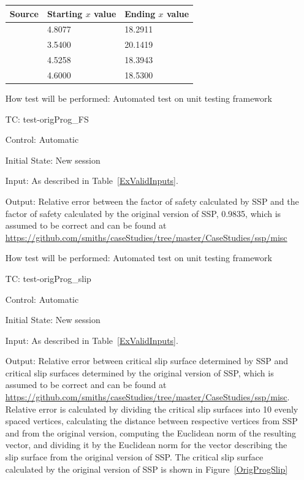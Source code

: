 \documentclass[12pt, titlepage]{article}
\newcounter{testnum} %
\newcommand{\progname}{SSP}
\begin{document}
\begin{enumerate}[label=TC\arabic*:,ref={\arabic*}]

\begin{tabularx}{1.0\textwidth}{l p{3.5cm} p{3.5cm}}
	\toprule \textbf{Source} & \textbf{Starting $x$ value} & 
	\textbf{Ending $x$ value}\\ \midrule
	\cite{Greco1996} & 4.8077 & 18.2911\\
	\cite{MalkawiEtAl} & 3.5400 & 20.1419\\
	\cite{ChengEtAl} & 4.5258 & 18.3943\\
	\cite{LiEtAl} & 4.6000 & 18.5300\\
	\bottomrule
\end{tabularx}

How test will be performed: Automated test on unit testing framework

\item [TC\refstepcounter{testnum}\thetestnum: \label{TC_OrigProgFS}] 
test-origProg\_FS

Control: Automatic

Initial State: New session

Input: As described in Table~\ref{ExValidInputs}.

Output: Relative error between the factor of safety calculated by \progname{} 
and the factor of safety calculated by the original version of \progname{}, 
0.9835, which is assumed to be correct and can be found at \newline
\href{https://github.com/smiths/caseStudies/tree/master/CaseStudies/ssp/misc}
{https://github.com/smiths/caseStudies/tree/master/CaseStudies/ssp/misc}

How test will be performed: Automated test on unit testing framework

\item [TC\refstepcounter{testnum}\thetestnum: \label{TC_OrigProgSlip}] 
test-origProg\_slip

Control: Automatic

Initial State: New session

Input: As described in Table~\ref{ExValidInputs}.

Output: Relative error between critical slip surface determined by \progname{} 
and critical slip surfaces determined by the original version of 
\progname{}, which is assumed to be correct and can be found at \newline
\href{https://github.com/smiths/caseStudies/tree/master/CaseStudies/ssp/misc}
{https://github.com/smiths/caseStudies/tree/master/CaseStudies/ssp/misc}. 
Relative error is calculated by dividing the critical slip surfaces into 10 
evenly spaced vertices, calculating the distance between respective vertices 
from \progname{} and from the original version, computing the Euclidean norm of 
the resulting vector, and dividing it by the Euclidean norm for the vector 
describing the slip surface from the original version of \progname{}. The 
critical slip surface calculated by the original version of SSP is shown in 
Figure~\ref{OrigProgSlip}


\end{enumerate}
\end{document}
